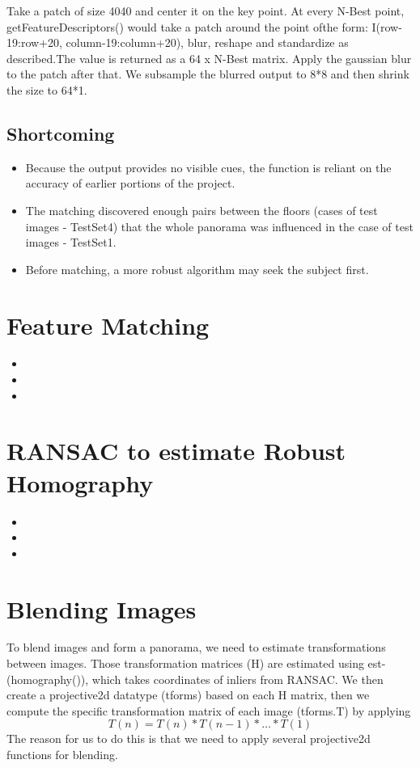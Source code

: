 \documentclass{CUP-JNL-PPS}
\begin{document}
Take a patch of size 4040 and center it on the key point. At every N-Best point, getFeatureDescriptors() would take a patch around the point ofthe form: I(row-19:row+20, column-19:column+20), blur, reshape and standardize as described.The value is returned as a 64 x N-Best matrix. Apply the gaussian blur to the patch after that. We subsample the blurred output to 8*8 and then shrink the size to 64*1.

\subsection{Shortcoming}
\begin{itemize}
    \item Because the output provides no visible cues, the function is reliant on the accuracy of earlier portions of the project.
    \item The matching discovered enough pairs between the floors (cases of test images - TestSet4) that the whole panorama was influenced in the case of test images - TestSet1.
    \item Before matching, a more robust algorithm may seek the subject first.
\end{itemize}

\section{Feature Matching}


\begin{itemize}
\item
\item 
\item 
\end{itemize}


\section{RANSAC to estimate Robust Homography}
\begin{itemize}
\item
\item 
\item 
\end{itemize}

\section{Blending Images}
To blend images and form a panorama, we need to estimate transformations between images.
Those transformation matrices (H) are estimated using est-(homography()), which takes
coordinates of inliers from RANSAC. We then create a projective2d datatype (tforms) based on each H matrix, then we compute the specific transformation matrix of each image (tforms.T) by applying \\
\begin{equation}
    T(n) = T(n) * T(n-1) * … * T(1)
\end{equation}
The reason for us to do this is that we need to apply several projective2d functions for blending.
\end{document}
